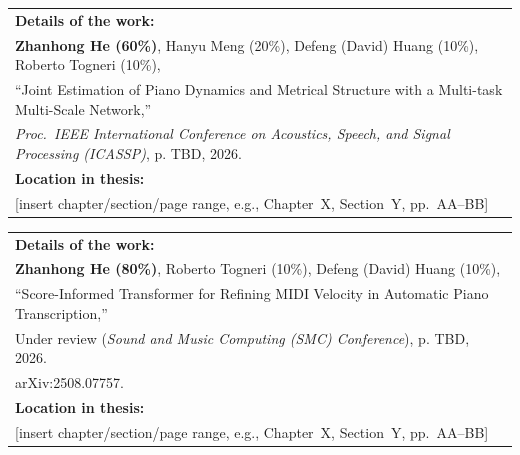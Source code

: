 \begin{tabular}{@{}p{\dimexpr\textwidth-2\tabcolsep\relax}@{}}
\textbf{Details of the work:} \\
\textbf{Zhanhong He (60\%)}, Hanyu Meng (20\%), Defeng (David) Huang (10\%), Roberto Togneri (10\%),\\
``Joint Estimation of Piano Dynamics and Metrical Structure with a Multi-task Multi-Scale Network,''\\
\emph{Proc.\ IEEE International Conference on Acoustics, Speech, and Signal Processing (ICASSP)},
p. TBD, 2026.\\
\textbf{Location in thesis:} \\
{[insert chapter/section/page range, e.g., Chapter~X, Section~Y, pp.~AA--BB]}\\%
\end{tabular} 
	
\vskip 0.5cm
	
\begin{tabular}{@{}p{\dimexpr\textwidth-2\tabcolsep\relax}@{}}
\textbf{Details of the work:} \\
\textbf{Zhanhong He (80\%)}, Roberto Togneri (10\%), Defeng (David) Huang (10\%),\\
``Score-Informed Transformer for Refining MIDI Velocity in Automatic Piano Transcription,''\\
Under review (\emph{Sound and Music Computing (SMC) Conference}), p. TBD, 2026.\\ arXiv:2508.07757. \\%
\textbf{Location in thesis:} \\
{[insert chapter/section/page range, e.g., Chapter~X, Section~Y, pp.~AA--BB]}\\%
\end{tabular} 
	
